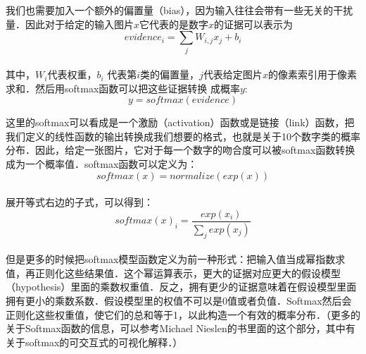 我们也需要加入一个额外的偏置量（bias），因为输入往往会带有一些无关的干扰量．因此对于给定的输入图片$x$它代表的是数字$x$的证据可以表示为\\
\begin{equation}
evidence_i = \sum_j{W_{i,j}}x_j+b_i
\end{equation}\\
其中，$W_i$代表权重，$b_i$ 代表第$i$类的偏置量，$j$代表给定图片$x$的像素索引用于像素求和．然后用softmax函数可以把这些证据转换
成概率$y$:\\
\begin{equation}
y = softmax(evidence)
\end{equation}

这里的softmax可以看成是一个激励（activation）函数或是链接（link）函数，把我们定义的线性函数的输出转换成我们想要的格式，也就是关于10个数字类的概率分布．因此，给定一张图片，它对于每一个数字的吻合度可以被softmax函数转换成为一个概率值．softmax函数可以定义为：\\
\begin{equation}
softmax(x) = normalize(exp(x))
\end{equation}\\
展开等式右边的子式，可以得到：\\
\begin{equation}
softmax(x)_i = \frac{exp(x_i)}{\sum_j{exp(x_j)}}
\end{equation}\\
但是更多的时候把softmax模型函数定义为前一种形式：把输入值当成幂指数求值，再正则化这些结果值．这个幂运算表示，更大的证据对应更大的假设模型（hypothesis）里面的乘数权重值．反之，拥有更少的证据意味着在假设模型里面拥有更小的乘数系数．假设模型里的权值不可以是0值或者负值．Softmax然后会正则化这些权重值，使它们的总和等于1，以此构造一个有效的概率分布．（更多的关于Softmax函数的信息，可以参考Michael Nieslen的书里面的这个部分，其中有关于softmax的可交互式的可视化解释．）

